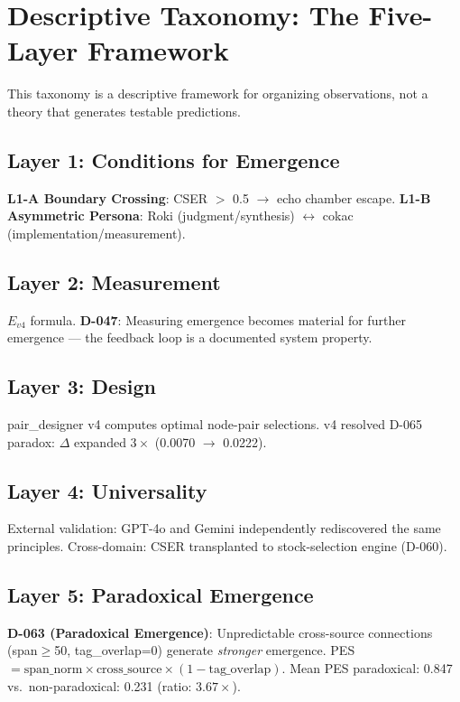 \documentclass[12pt]{article}
\begin{document}
\section{Descriptive Taxonomy: The Five-Layer Framework}
\label{sec:five_layer}

\noindent This taxonomy is a descriptive framework for organizing observations, not a theory that generates testable predictions.

\subsection*{Layer 1: Conditions for Emergence}
\textbf{L1-A Boundary Crossing}: CSER $>$ 0.5 $\to$ echo chamber escape.
\textbf{L1-B Asymmetric Persona}: Roki (judgment/synthesis) $\leftrightarrow$
cokac (implementation/measurement).

\subsection*{Layer 2: Measurement}
$E_{v4}$ formula. \textbf{D-047}: Measuring emergence becomes material for further
emergence --- the feedback loop is a documented system property.

\subsection*{Layer 3: Design}
pair\_designer v4 computes optimal node-pair selections.
v4 resolved D-065 paradox: $\Delta$ expanded $3\times$ (0.0070 $\to$ 0.0222).

\subsection*{Layer 4: Universality}
External validation: GPT-4o and Gemini independently rediscovered the same principles.
Cross-domain: CSER transplanted to stock-selection engine (D-060).

\subsection*{Layer 5: Paradoxical Emergence}

\textbf{D-063 (Paradoxical Emergence)}: Unpredictable cross-source connections
(span$\geq$50, tag\_overlap=0) generate \textit{stronger} emergence.
PES $= \text{span\_norm} \times \text{cross\_source} \times (1 - \text{tag\_overlap})$.
Mean PES paradoxical: 0.847 vs.\ non-paradoxical: 0.231 (ratio: $3.67\times$).
\end{document}
